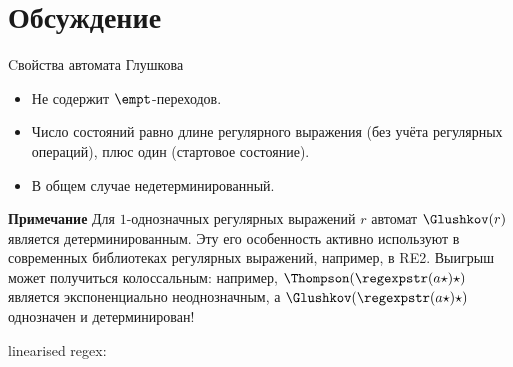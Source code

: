 \section{Обсуждение}
\begin{frame}{Cвойства автомата Глушкова}
  \begin{itemize}
    \item Не содержит $\empt$-переходов.
    \item Число состояний равно длине регулярного выражения (без учёта регулярных операций), плюс один (стартовое состояние).
    \item В общем случае недетерминированный.
  \end{itemize}

  \begin{alertblock}{\bf Примечание}
    Для $1$-однозначных регулярных выражений $r$ автомат $\Glushkov(r)$ является детерминированным. Эту его особенность активно используют в современных библиотеках регулярных выражений, например, в \textsc{RE2}. Выигрыш может получиться колоссальным: например, $\Thompson(\regexpstr(a\star)\star)$ является экспоненциально неоднозначным, а $\Glushkov(\regexpstr(a\star)\star)$ однозначен и детерминирован!
  \end{alertblock}%
	linearised regex:


\end{frame}




